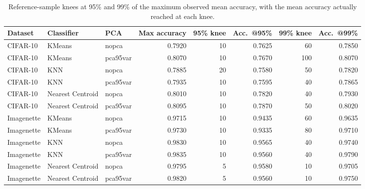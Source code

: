 \documentclass[sigconf,review]{acmart}
\begin{document}
\begin{table}[t]
  \caption{Reference-sample knees at 95\% and 99\% of the maximum observed mean accuracy, with the mean accuracy actually reached at each knee.}
  \label{tab:sweet-spots}
  \centering
  \footnotesize
  \begin{tabular}{@{}lllrrrrr@{}}
    \toprule
    Dataset & Classifier & PCA & Max accuracy & 95\% knee & Acc.\ @95\% & 99\% knee & Acc.\ @99\% \\
    \midrule
    CIFAR-10 & KMeans & nopca & 0.7920 & 10 & 0.7625 & 60 & 0.7850 \\
    CIFAR-10 & KMeans & pca95var & 0.8070 & 10 & 0.7670 & 100 & 0.8070 \\
    CIFAR-10 & KNN & nopca & 0.7885 & 20 & 0.7580 & 50 & 0.7820 \\
    CIFAR-10 & KNN & pca95var & 0.7935 & 10 & 0.7595 & 40 & 0.7865 \\
    CIFAR-10 & Nearest Centroid & nopca & 0.8010 & 10 & 0.7820 & 40 & 0.7930 \\
    CIFAR-10 & Nearest Centroid & pca95var & 0.8095 & 10 & 0.7870 & 50 & 0.8020 \\
    Imagenette & KMeans & nopca & 0.9715 & 10 & 0.9435 & 60 & 0.9635 \\
    Imagenette & KMeans & pca95var & 0.9730 & 10 & 0.9335 & 80 & 0.9710 \\
    Imagenette & KNN & nopca & 0.9830 & 10 & 0.9565 & 40 & 0.9740 \\
    Imagenette & KNN & pca95var & 0.9835 & 10 & 0.9560 & 40 & 0.9790 \\
    Imagenette & Nearest Centroid & nopca & 0.9795 & 5 & 0.9580 & 10 & 0.9705 \\
    Imagenette & Nearest Centroid & pca95var & 0.9820 & 5 & 0.9560 & 10 & 0.9750 \\
    \bottomrule
  \end{tabular}
\end{table}
\end{document}
